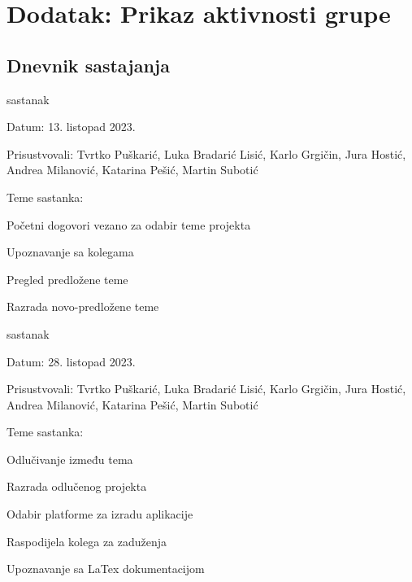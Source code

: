\chapter*{Dodatak: Prikaz aktivnosti grupe}
		
		\section*{Dnevnik sastajanja}
		
		\begin{packed_enum}
			
			\item  sastanak
			\item[] \begin{packed_item}
				\item Datum: 13. listopad 2023.
				\item Prisustvovali: Tvrtko Puškarić, Luka Bradarić Lisić, Karlo Grgičin, Jura Hostić, Andrea Milanović, Katarina Pešić, Martin Subotić
				\item Teme sastanka:
				\begin{packed_item}
					\item Početni dogovori vezano za odabir teme projekta
					\item Upoznavanje sa kolegama
					\item Pregled predložene teme
					\item Razrada novo-predložene teme
				\end{packed_item}
			\end{packed_item}
			
			\item  sastanak
			\item[] \begin{packed_item}
				\item Datum: 28. listopad 2023.
				\item Prisustvovali: Tvrtko Puškarić, Luka Bradarić Lisić, Karlo Grgičin, Jura Hostić, Andrea Milanović, Katarina Pešić, Martin Subotić
				\item Teme sastanka:
				\begin{packed_item}
					\item Odlučivanje između tema
					\item Razrada odlučenog projekta
					\item Odabir platforme za izradu aplikacije
					\item Raspodijela kolega za zaduženja
					\item Upoznavanje sa LaTex dokumentacijom
				\end{packed_item}
			\end{packed_item}
			

\end{packed_enum}
